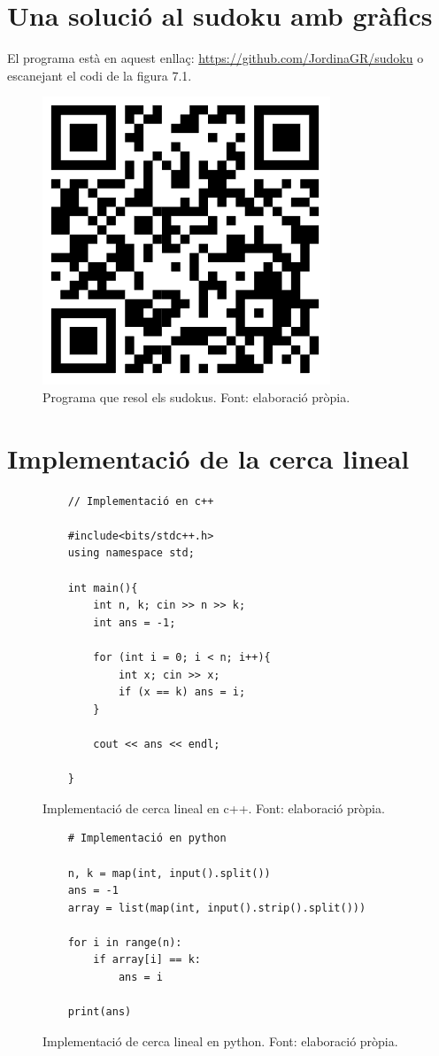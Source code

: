 \section{Una solució al sudoku amb gràfics}
El programa està en aquest enllaç: \url{https://github.com/JordinaGR/sudoku} o escanejant el codi de la figura 7.1.
\begin{figure}[H]
    \centering
    \includegraphics[width=.15\textwidth]{capitols/figures/qr2.png}
    \caption[Programa que resol els sudokus.]{Programa que resol els sudokus. Font: elaboració pròpia.}
    \label{fig:my_label}
\end{figure}

\section{Implementació de la cerca lineal}
\begin{figure}[H]
    \begin{verbatim}
    // Implementació en c++
    
    #include<bits/stdc++.h>
    using namespace std;

    int main(){
    	int n, k; cin >> n >> k;
    	int ans = -1;
    	
    	for (int i = 0; i < n; i++){
    		int x; cin >> x;
    		if (x == k) ans = i;
    	}
    	
    	cout << ans << endl;
    	
    }
    \end{verbatim}
    \caption[Implementació de cerca lineal.]{Implementació de cerca lineal en c++. Font: elaboració pròpia.}
    \label{Figura}
\end{figure}%
\begin{figure}[H]
    \begin{verbatim}
    # Implementació en python
        
    n, k = map(int, input().split())
    ans = -1
    array = list(map(int, input().strip().split()))
    
    for i in range(n):
        if array[i] == k:
            ans = i
    
    print(ans)
    \end{verbatim}
    \caption[Implementació de cerca lineal.]{Implementació de cerca lineal en python. Font: elaboració pròpia.}
    \label{Figura}
\end{figure}

